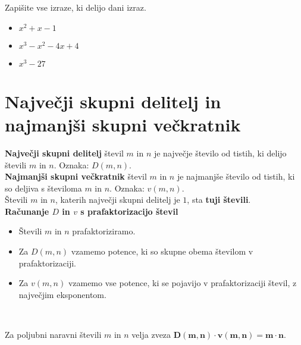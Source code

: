         \begin{naloga}
            Zapišite vse izraze, ki delijo dani izraz.
            \begin{itemize}
                \item $x^2+x-1$ 
                \item $x^3-x^2-4x+4$ 
                \item $x^3-27$ 
            \end{itemize}
        \end{naloga}

    

\newpage

\section{Največji skupni delitelj in najmanjši skupni večkratnik}

        

                \textbf{Največji skupni delitelj} števil $m$ in $n$ je največje število od tistih, ki delijo števili $m$ in $n$. 
                Oznaka: $D(m,n)$.           
                \\

                \textbf{Najmanjši skupni večkratnik} števil $m$ in $n$ je najmanjše število od tistih, ki so deljiva s številoma $m$ in $n$. 
                Oznaka: $v(m,n)$.
                \\

            
                Števili $m$ in $n$, katerih največji skupni delitelj je $1$, sta \textbf{tuji števili}.
                \\
        

        
            \textbf{Računanje $D$ in $v$ s prafaktorizacijo števil}
                \begin{itemize}
                    \item Števili $m$ in $n$ prafaktoriziramo.
                    \item Za $D(m,n)$ vzamemo potence, ki so skupne obema številom v prafaktorizaciji.
                    \item Za $v(m,n)$ vzamemo vse potence, ki se pojavijo v prafaktorizaciji števil, z največjim eksponentom.
                \end{itemize}                
            ~

            
                Za poljubni naravni števili $m$ in $n$ velja zveza $\mathbf{D(m,n)\cdot v(m,n)=m\cdot n}$.
            \\

